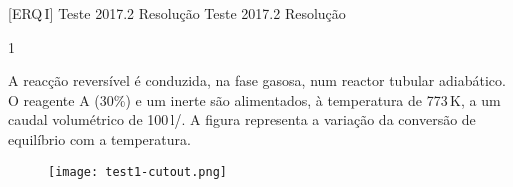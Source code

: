 \documentclass[\mainfilename]{subfiles}
\begin{document}
\graphicspath{{\subfix{./.build/figures/ERQ_I-Testes_Resolucoes.2017.2}}}

[ERQ\,I]
{Teste 2017.2 Resolução} %
{Teste 2017.2 Resolução} %



\begin{questionBox}1{ %
    A reacção reversível  é conduzida, na fase gasosa, num reactor tubular adiabático. O reagente A (30\%) e um inerte são alimentados, à temperatura de 773\,\unit{\kelvin}, a um caudal volumétrico de 100\,\unit{\litre/\min}. A figura representa a variação da conversão de equilíbrio com a temperatura.
    \begin{figure}\centering
        \texttt{[image: test1-cutout.png]}
    \end{figure}
} %

\end{questionBox}
\end{document}
